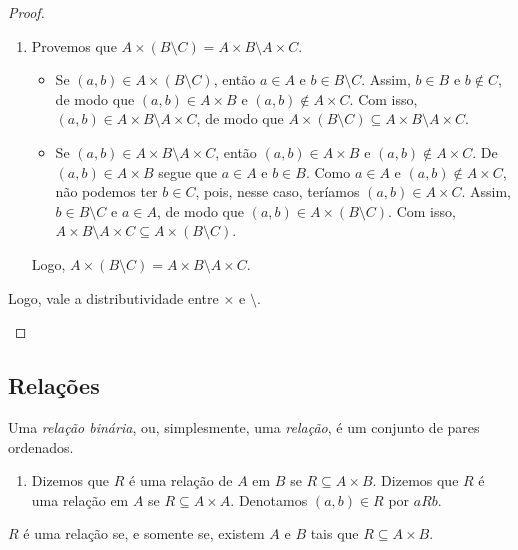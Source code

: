 \begin{proof}
\begin{enumerate}[leftmargin=*, align=left, label=\textbf{(\alph*)}]
\begin{enumerate}[label=\roman*.]
                    \item Provemos que $A \times (B \setminus C) = A \times B \setminus A \times C$.
                        \begin{itemize}
                            \item[($\subseteq$)] Se $(a,b) \in A \times (B \setminus C)$, então $a \in A$ e $b \in B \setminus C$. Assim, $b \in B$ e $b \notin C$, de modo que $(a,b) \in A \times B$ e $(a,b) \notin A \times C$. Com isso, $(a,b) \in A \times B \setminus A \times C$, de modo que $A \times (B \setminus C) \subseteq A \times B \setminus A \times C$.
                            \item[($\supseteq$)] Se $(a,b) \in A \times B \setminus A \times C$, então $(a,b) \in A \times B$ e $(a,b) \notin A \times C$. De $(a,b) \in A \times B$ segue que $a \in A$ e $b \in B$. Como $a \in A$ e $(a,b) \notin A \times C$, não podemos ter $b \in C$, pois, nesse caso, teríamos $(a,b) \in A \times C$. Assim, $b \in B \setminus C$ e $a \in A$, de modo que $(a,b) \in A \times (B \setminus C)$. Com isso, $A \times B \setminus A \times C \subseteq A \times (B \setminus C)$.
                        \end{itemize}
                    Logo, $A \times (B \setminus C) = A \times B \setminus A \times C$.
                \end{enumerate}
            Logo, vale a distributividade entre $\times$ e $\setminus$. \blackproof
        \end{enumerate}
\end{proof}

\subsection{Relações}

\begin{definition}
    Uma \emph{relação binária}, ou, simplesmente, uma \emph{relação}, é um conjunto de pares ordenados.
        \begin{enumerate}[leftmargin=*, align=left, label=\textbf{(\alph*)}]
            \item Dizemos que $R$ é uma relação de $A$ em $B$ se $R \subseteq A \times B$. Dizemos que $R$ é uma relação em $A$ se $R \subseteq A \times A$. Denotamos $(a,b) \in R$ por $aRb$.
        \end{enumerate}
\end{definition}

\begin{theorem}
    $R$ é uma relação se, e somente se, existem $A$ e $B$ tais que $R \subseteq A \times B$.
\end{theorem}

